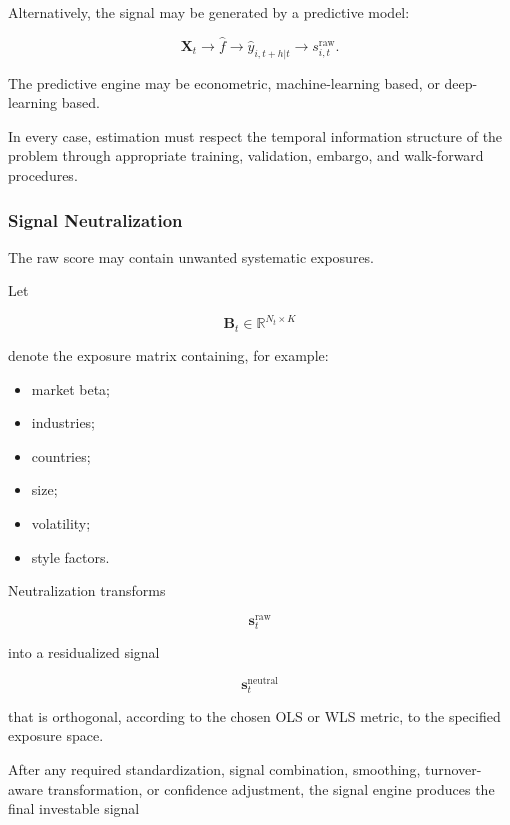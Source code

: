 \documentclass[11pt,a4paper]{article}
\begin{document}
Alternatively, the signal may be generated by a predictive model:

\begin{equation}
\mathbf{X}_t
\rightarrow
\widehat{f}
\rightarrow
\widehat{y}_{i,t+h|t}
\rightarrow
s_{i,t}^{\mathrm{raw}}.
\end{equation}

The predictive engine may be econometric, machine-learning based, or
deep-learning based.

In every case, estimation must respect the temporal information structure of
the problem through appropriate training, validation, embargo, and walk-forward
procedures.


\subsubsection{Signal Neutralization}

The raw score may contain unwanted systematic exposures.

Let

\begin{equation}
\mathbf{B}_t
\in
\mathbb{R}^{N_t\times K}
\end{equation}

denote the exposure matrix containing, for example:

\begin{itemize}
    \item market beta;
    \item industries;
    \item countries;
    \item size;
    \item volatility;
    \item style factors.
\end{itemize}

Neutralization transforms

\begin{equation}
\mathbf{s}_t^{\mathrm{raw}}
\end{equation}

into a residualized signal

\begin{equation}
\boxed{
\mathbf{s}_t^{\mathrm{neutral}}
}
\end{equation}

that is orthogonal, according to the chosen OLS or WLS metric, to the specified
exposure space.

After any required standardization, signal combination, smoothing,
turnover-aware transformation, or confidence adjustment, the signal engine
produces the final investable signal
\end{document}
